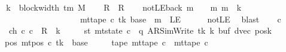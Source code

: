 \begin{isabellebody}
%
\isadelimproof
%
\endisadelimproof
%
\isatagproof
{}\isamarkupfalse%
\ {\isacharminus}{\kern0pt}\isanewline
\ \ \isamarkupfalse%
\ {\isacharquery}{\kern0pt}k\ {\isacharequal}{\kern0pt}\ {\isachardoublequoteopen}block{\isacharunderscore}{\kern0pt}width\ {\isacharparenleft}{\kern0pt}{\isasymGamma}{\isacharunderscore}{\kern0pt}tm\ M{\isacharparenright}{\kern0pt}{\isachardoublequoteclose}\isanewline
\ \ \isamarkupfalse%
\ {\isacharquery}{\kern0pt}R\ {\isacharequal}{\kern0pt}\ R{\isacharprime}{\kern0pt}\isanewline
\ \ \isamarkupfalse%
\ notLE{\isacharunderscore}{\kern0pt}back{\isacharcolon}{\kern0pt}\ {\isachardoublequoteopen}{\isasymAnd}m{\isachardot}{\kern0pt}\ {\isasymlbrakk}\ {}\ {\isasymle}\ m{\isacharsemicolon}{\kern0pt}\ m\ {\isasymle}\ {\isacharquery}{\kern0pt}k\ {\isasymrbrakk}\isanewline
\ \ \ \ \ \ \ \ \ \ \ \ \ \ \ \ \ \ \ \ \ \ {\isasymLongrightarrow}\ mt{\isacharunderscore}{\kern0pt}tape\ c{\isacharprime}{\kern0pt}\ tk\ {\isacharparenleft}{\kern0pt}base\ {\isacharplus}{\kern0pt}\ m{\isacharparenright}{\kern0pt}\ {\isasymnoteq}\ LE{}{\isachardoublequoteclose}\isanewline
\ \ \ \ \isamarkupfalse%
\ notLE\ \isamarkupfalse%
\ blast\isanewline
\ \ \isamarkupfalse%
\ c{}\ \isanewline
\ \ \ \ \ \ ch{}{\isacharcolon}{\kern0pt}\ {\isachardoublequoteopen}{\isacharparenleft}{\kern0pt}c{\isacharprime}{\kern0pt}{\isacharcomma}{\kern0pt}\ c{}{\isacharparenright}{\kern0pt}\ {\isasymin}\ {\isacharquery}{\kern0pt}R\ {\isacharcircum}{\kern0pt}{\isacharcircum}{\kern0pt}\ {\isacharquery}{\kern0pt}k{\isachardoublequoteclose}\isanewline
\ \ \ \ \ st{}{\isacharcolon}{\kern0pt}\ {\isachardoublequoteopen}mt{\isacharunderscore}{\kern0pt}state\ c{}\ {\isacharequal}{\kern0pt}\ {\isacharparenleft}{\kern0pt}q{\isacharcomma}{\kern0pt}\ AR{\isacharunderscore}{\kern0pt}SimWrite{\isacharcomma}{\kern0pt}\ tk{\isacharcomma}{\kern0pt}\ {\isacharquery}{\kern0pt}k{\isacharcomma}{\kern0pt}\ buf{\isacharcomma}{\kern0pt}\ dvec{\isacharcomma}{\kern0pt}\ posk{\isacharparenright}{\kern0pt}{\isachardoublequoteclose}\isanewline
\ \ \ \ \ pos{}{\isacharcolon}{\kern0pt}\ {\isachardoublequoteopen}mt{\isacharunderscore}{\kern0pt}pos\ c{}\ tk\ {\isacharequal}{\kern0pt}\ base{\isachardoublequoteclose}\isanewline
\ \ \ \ \ tape{}{\isacharcolon}{\kern0pt}\ {\isachardoublequoteopen}mt{\isacharunderscore}{\kern0pt}tape\ c{}\ {\isacharequal}{\kern0pt}\ mt{\isacharunderscore}{\kern0pt}tape\ c{\isacharprime}{\kern0pt}{\isachardoublequoteclose}\isanewline

\end{isabellebody}
